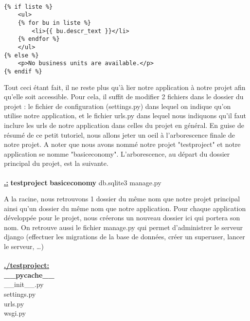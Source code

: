\begin{lstlisting}

{% if liste %}
    <ul>
    {% for bu in liste %}
        <li>{{ bu.descr_text }}</li>
    {% endfor %}
    </ul>
{% else %}
    <p>No business units are available.</p>
{% endif %}

\end{lstlisting}

Tout ceci étant fait,  il ne reste plus qu'à lier notre application à notre projet afin qu'elle soit accessible.  Pour cela,  il suffit de modifier 2 fichiers dans le dossier du projet : le fichier de configuration (settings.py) dans lequel on indique qu'on utilise notre application,  et le fichier urls.py dans lequel nous indiquons qu'il faut inclure les urls de notre application dans celles du projet en général.  
En guise de résumé de ce petit tutoriel,  nous allons jeter un oeil à l'arborescence finale de notre projet.  A noter que nous avons nommé notre projet "testproject" et notre application se nomme "basiceconomy".  L'arborescence,   au départ du dossier principal du projet,  est la suivante.
\\
\\
\underline{\textbf{.:}} \newline
\textbf{testproject} \newline
\textbf{basiceconomy} \newline
db.sqlite3 \newline
manage.py \newline

A la racine,  nous retrouvons 1 dossier du même nom que notre projet principal ainsi qu'un dossier du même nom que notre application.  Pour chaque application développée pour le projet,  nous créerons un nouveau dossier ici qui portera son nom.  On retrouve aussi le fichier manage.py qui permet d'administrer le serveur django (effectuer les migrations de la base de données,  créer un superuser,  lancer le serveur, \dots )
\\
\\
\underline{\textbf{./testproject:}} \\
\textbf{\_\_pycache\_\_} \\
\_\_init\_\_.py \\
settings.py \\
urls.py \\
wsgi.py \\

